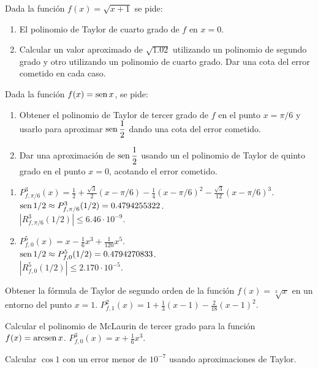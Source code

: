 
{Dada la función $f(x)=\sqrt{x+1}$ se pide:
\begin{enumerate}
\item  El polinomio de Taylor de cuarto grado de $f$ en $x=0$.
\item  Calcular un valor aproximado de $\sqrt{1.02}$ utilizando un polinomio de segundo grado y otro utilizando un polinomio de cuarto grado. Dar una cota del error cometido en cada caso.
\end{enumerate}
}


{Dada la función $f(x)=\operatorname{sen} x$, se pide:
\begin{enumerate}
\item  Obtener el polinomio de Taylor de tercer grado de $f$ en el punto $x=\pi/6$ y usarlo para aproximar $\operatorname{sen}\dfrac{1}{2}$ dando una cota del error cometido.
\item  Dar una aproximación de $\operatorname{sen}\dfrac{1}{2}$ usando un el polinomio de Taylor de quinto grado en el punto $x=0$, acotando el error cometido.
\end{enumerate}
}
{
\begin{enumerate}
\item $P^3_{f,\pi/6}(x) = \frac{1}{2}+\frac{\sqrt{3}}{2}(x-\pi/6)-\frac{1}{4}(x-\pi/6)^2-\frac{\sqrt{3}}{12}(x-\pi/6)^3$.\\
$\operatorname{sen} 1/2 \approx P^3_{f,\pi/6}(1/2) = 0.4794255322$.\\
$|R^3_{f,\pi/6}(1/2)|\leq 6.46\cdot 10^{-9}$.
\item $P^5_{f,0}(x) = x -\frac{1}{6} x^3 + \frac{1}{120}x^5$.\\
$\operatorname{sen} 1/2 \approx P^5_{f,0}(1/2) = 0.4794270833$.\\
$|R^5_{f,0}(1/2)|\leq 2.170\cdot 10^{-5}$.
\end{enumerate}
}
{
}


{Obtener la fórmula de Taylor de segundo orden de la función $f(x)=\sqrt[3]{x}$ en un entorno del punto $x=1$.
}
{$P^2_{f,1}(x) = 1+\frac{1}{3}(x-1)-\frac{2}{18}(x-1)^2$. 
}
{
}


{Calcular el polinomio de McLaurin de tercer grado para la función $f(x)=\operatorname{arcsen} x$.
}
{$P^3_{f,0}(x) = x+\frac{1}{6}x^3$. 
}
{
}


{Calcular $\cos 1$ con un error menor de $10^{-7}$ usando aproximaciones de Taylor.
}


